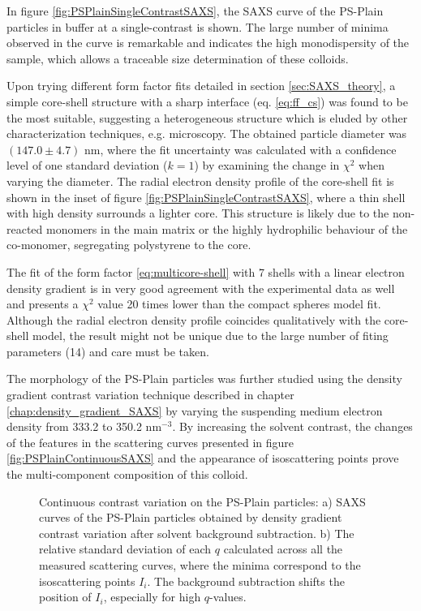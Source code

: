 In figure \ref{fig:PSPlainSingleContrastSAXS}, the SAXS curve of the PS-Plain particles in buffer at a single-contrast is shown. The large number of minima observed in the curve is remarkable and indicates the high monodispersity of the sample, which allows a traceable size determination of these colloids.

Upon trying different form factor fits detailed in section \ref{sec:SAXS_theory}, a simple core-shell structure with a sharp interface (eq. \ref{eq:ff_cs}) was found to be the most suitable, suggesting a heterogeneous structure which is eluded by other characterization techniques, e.g. microscopy. The obtained particle diameter was $(147.0\pm4.7)$ nm, where the fit uncertainty was calculated with a confidence level of one standard deviation ($k=1$) by examining the change in $\chi^2$ when varying the diameter. The radial electron density profile of the core-shell fit is shown in the inset of figure \ref{fig:PSPlainSingleContrastSAXS}, where a thin shell with high density surrounds a lighter core. This structure is likely due to the non-reacted monomers in the main matrix or the highly hydrophilic behaviour of the co-monomer, segregating polystyrene to the core.

The fit of the form factor \ref{eq:multicore-shell} with 7 shells with a linear electron density gradient is in very good agreement with the experimental data as well and presents a $\chi^2$ value 20 times lower than the compact spheres model fit. Although the radial electron density profile coincides qualitatively with the core-shell model, the result might not be unique due to the large number of fiting parameters (14) and care must be taken.

The morphology of the PS-Plain particles was further studied using the density gradient contrast variation technique described in chapter \ref{chap:density_gradient_SAXS} by varying the suspending medium electron density from 333.2 to 350.2 nm$^{-3}$. By increasing the solvent contrast, the changes of the features in the scattering curves presented in figure \ref{fig:PSPlainContinuousSAXS} and the appearance of isoscattering points prove the multi-component composition of this colloid.

\begin{figure*}%
	\centering
                \qquad
	\caption[Continuous contrast variation experimental data of the PS-Plain particles.]{Continuous contrast variation on the PS-Plain particles: a) SAXS curves of the PS-Plain particles obtained by density gradient contrast variation after solvent background subtraction. b) The relative standard deviation of each $q$ calculated across all the measured scattering curves, where the minima correspond to the isoscattering points $I_i$. The background subtraction shifts the position of $I_i$, especially for high $q$-values.}
\end{figure*}

